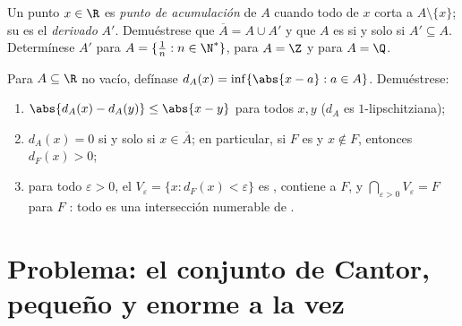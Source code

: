 \begin{exercise}[$\star\star$]\label{exo:b1:topology:11}
Un punto $x \in \R$ es \emph{punto de acumulación} de $A$ cuando todo
 de $x$ corta a $A \setminus \{x\}$; su  es el
\emph{ derivado} $A'$. Demuéstrese que
$\overline A = A \cup A'$ y que $A$ es  si y solo si
$A' \subseteq A$. Determínese $A'$ para $A = \{\frac 1n : n \in \N^*\}$,
para $A = \Z$ y para $A = \Q$.
\end{exercise}

\begin{exercise}[$\star\star\star$]\label{exo:b1:topology:12}
Para $A \subseteq \R$ no vacío, defínase
$d_A(x) = \inf\{\abs{x - a} : a \in A\}$. Demuéstrese:
\begin{enumerate}
  \item $\abs{d_A(x) - d_A(y)} \leq \abs{x - y}$ para todos $x, y$
        ($d_A$ es $1$-lipschitziana);
  \item $d_A(x) = 0$ si y solo si $x \in \overline A$; en particular,
        si $F$ es  y $x \notin F$, entonces $d_F(x) > 0$;
  \item para todo $\varepsilon > 0$, el  $V_\varepsilon =
        \{x : d_F(x) < \varepsilon\}$ es , contiene a $F$, y
        $\bigcap_{\varepsilon > 0} V_\varepsilon = F$ para $F$
        : todo  es una intersección numerable de
        .
\end{enumerate}
\end{exercise}

\section{Problema: el conjunto de Cantor, pequeño y enorme a la vez}

